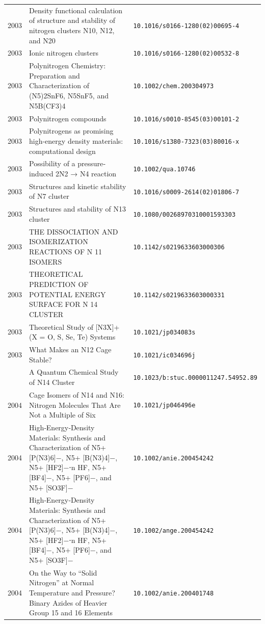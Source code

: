 \begin{longtable}{@{}p{1.0cm}p{10.5cm}p{3.5cm}@{}}
2003 & Density functional calculation of structure and stability of nitrogen clusters N10, N12, and N20 & \small\texttt{10.1016/s0166-1280(02)00695-4} \\
2003 & Ionic nitrogen clusters & \small\texttt{10.1016/s0166-1280(02)00532-8} \\
2003 & Polynitrogen Chemistry: Preparation and Characterization of (N5)2SnF6, N5SnF5, and N5B(CF3)4 & \small\texttt{10.1002/chem.200304973} \\
2003 & Polynitrogen compounds & \small\texttt{10.1016/s0010-8545(03)00101-2} \\
2003 & Polynitrogens as promising high-energy density materials: computational design & \small\texttt{10.1016/s1380-7323(03)80016-x} \\
2003 & Possibility of a pressure‐induced 2N2 → N4 reaction & \small\texttt{10.1002/qua.10746} \\
2003 & Structures and kinetic stability of N7 cluster & \small\texttt{10.1016/s0009-2614(02)01806-7} \\
2003 & Structures and stability of N13 cluster & \small\texttt{10.1080/00268970310001593303} \\
2003 & THE DISSOCIATION AND ISOMERIZATION REACTIONS OF N 11 ISOMERS & \small\texttt{10.1142/s0219633603000306} \\
2003 & THEORETICAL PREDICTION OF POTENTIAL ENERGY SURFACE FOR N 14 CLUSTER & \small\texttt{10.1142/s0219633603000331} \\
2003 & Theoretical Study of [N3X]+ (X = O, S, Se, Te) Systems & \small\texttt{10.1021/jp034083s} \\
2003 & What Makes an N12 Cage Stable? & \small\texttt{10.1021/ic034696j} \\
\addlinespace
2004 & A Quantum Chemical Study of N14 Cluster & \small\texttt{10.1023/b:stuc.0000011247.54952.89} \\
2004 & Cage Isomers of N14 and N16: Nitrogen Molecules That Are Not a Multiple of Six & \small\texttt{10.1021/jp046496e} \\
2004 & High‐Energy‐Density Materials: Synthesis and Characterization of N5+[P(N3)6]−, N5+ [B(N3)4]−, N5+ [HF2]−⋅n HF, N5+ [BF4]−, N5+ [PF6]−, and N5+ [SO3F]− & \small\texttt{10.1002/anie.200454242} \\
2004 & High‐Energy‐Density Materials: Synthesis and Characterization of N5+[P(N3)6]−, N5+ [B(N3)4]−, N5+ [HF2]−⋅n HF, N5+ [BF4]−, N5+ [PF6]−, and N5+ [SO3F]− & \small\texttt{10.1002/ange.200454242} \\
2004 & On the Way to “Solid Nitrogen” at Normal Temperature and Pressure? Binary Azides of Heavier Group 15 and 16 Elements & \small\texttt{10.1002/anie.200401748} \\

\end{longtable}
